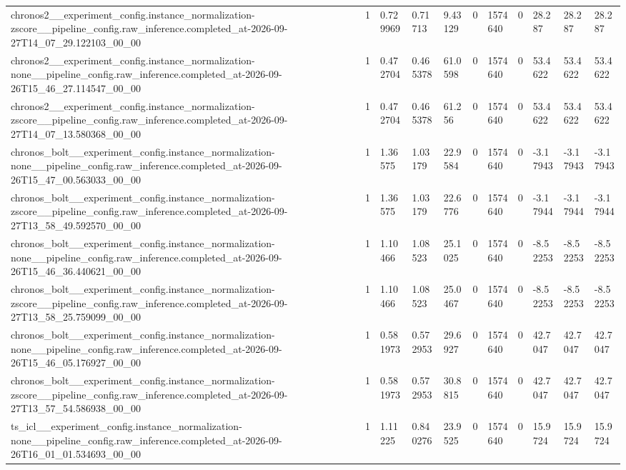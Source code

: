 \begin{tabular}{lllllllllll}
chronos2\_\_experiment\_config.instance\_normalization-zscore\_\_pipeline\_config.raw\_inference.completed\_at-2026-09-27T14\_07\_29.122103\_00\_00 & 1 & 0.729969 & 0.71713 & 9.43129 & 0 & 1574640 & 0 & 28.287 & 28.287 & 28.287 \\
chronos2\_\_experiment\_config.instance\_normalization-none\_\_pipeline\_config.raw\_inference.completed\_at-2026-09-26T15\_46\_27.114547\_00\_00 & 1 & 0.472704 & 0.465378 & 61.0598 & 0 & 1574640 & 0 & 53.4622 & 53.4622 & 53.4622 \\
chronos2\_\_experiment\_config.instance\_normalization-zscore\_\_pipeline\_config.raw\_inference.completed\_at-2026-09-27T14\_07\_13.580368\_00\_00 & 1 & 0.472704 & 0.465378 & 61.256 & 0 & 1574640 & 0 & 53.4622 & 53.4622 & 53.4622 \\
chronos\_bolt\_\_experiment\_config.instance\_normalization-none\_\_pipeline\_config.raw\_inference.completed\_at-2026-09-26T15\_47\_00.563033\_00\_00 & 1 & 1.36575 & 1.03179 & 22.9584 & 0 & 1574640 & 0 & -3.17943 & -3.17943 & -3.17943 \\
chronos\_bolt\_\_experiment\_config.instance\_normalization-zscore\_\_pipeline\_config.raw\_inference.completed\_at-2026-09-27T13\_58\_49.592570\_00\_00 & 1 & 1.36575 & 1.03179 & 22.6776 & 0 & 1574640 & 0 & -3.17944 & -3.17944 & -3.17944 \\
chronos\_bolt\_\_experiment\_config.instance\_normalization-none\_\_pipeline\_config.raw\_inference.completed\_at-2026-09-26T15\_46\_36.440621\_00\_00 & 1 & 1.10466 & 1.08523 & 25.1025 & 0 & 1574640 & 0 & -8.52253 & -8.52253 & -8.52253 \\
chronos\_bolt\_\_experiment\_config.instance\_normalization-zscore\_\_pipeline\_config.raw\_inference.completed\_at-2026-09-27T13\_58\_25.759099\_00\_00 & 1 & 1.10466 & 1.08523 & 25.0467 & 0 & 1574640 & 0 & -8.52253 & -8.52253 & -8.52253 \\
chronos\_bolt\_\_experiment\_config.instance\_normalization-none\_\_pipeline\_config.raw\_inference.completed\_at-2026-09-26T15\_46\_05.176927\_00\_00 & 1 & 0.581973 & 0.572953 & 29.6927 & 0 & 1574640 & 0 & 42.7047 & 42.7047 & 42.7047 \\
chronos\_bolt\_\_experiment\_config.instance\_normalization-zscore\_\_pipeline\_config.raw\_inference.completed\_at-2026-09-27T13\_57\_54.586938\_00\_00 & 1 & 0.581973 & 0.572953 & 30.8815 & 0 & 1574640 & 0 & 42.7047 & 42.7047 & 42.7047 \\
ts\_icl\_\_experiment\_config.instance\_normalization-none\_\_pipeline\_config.raw\_inference.completed\_at-2026-09-26T16\_01\_01.534693\_00\_00 & 1 & 1.11225 & 0.840276 & 23.9525 & 0 & 1574640 & 0 & 15.9724 & 15.9724 & 15.9724 \\

\end{tabular}
